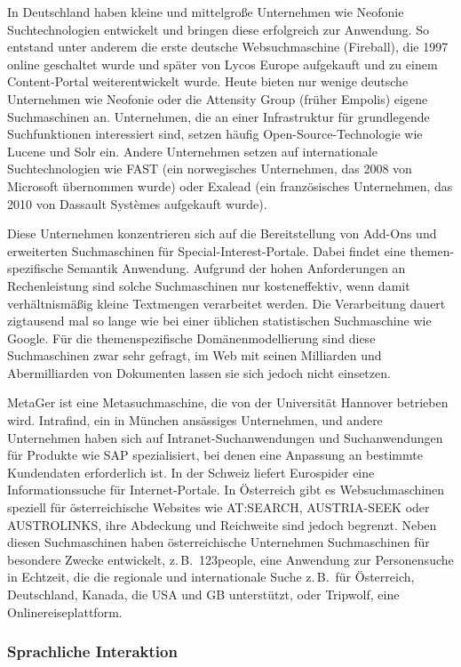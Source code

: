 \documentclass[]{../../metanetpaper}
\begin{document}
\begin{multicols}{2}
In Deutschland haben kleine und mittelgroße Unternehmen wie Neofonie Suchtechnologien entwickelt und bringen diese erfolgreich zur Anwendung. So entstand unter anderem die erste deutsche Websuchmaschine (Fireball), die 1997 online geschaltet wurde und später von Lycos Europe aufgekauft und zu einem Content-Portal weiterentwickelt wurde. Heute bieten nur wenige deutsche Unternehmen wie Neofonie oder die Attensity Group (früher Empolis) eigene Suchmaschinen an. Unternehmen, die an einer Infrastruktur für grundlegende Suchfunktionen interessiert sind, setzen häufig Open-Source-Technologie wie Lucene und Solr ein. Andere Unternehmen setzen auf internationale Suchtechnologien wie FAST (ein norwegisches Unternehmen, das 2008 von Microsoft übernommen wurde) oder Exalead (ein französisches Unternehmen, das 2010 von Dassault Systèmes aufgekauft wurde).

Diese Unternehmen konzentrieren sich auf die Bereitstellung von Add-Ons und erweiterten Suchmaschinen für Special-Interest-Portale. Dabei findet eine themen-spezifische Semantik Anwendung. Aufgrund der hohen Anforderungen an Rechenleistung sind solche Suchmaschinen nur kosteneffektiv, wenn damit verhältnismäßig kleine Textmengen verarbeitet werden. Die Verarbeitung dauert zigtausend mal so lange wie bei einer üblichen statistischen Suchmaschine wie Google. Für die themenspezifische Domänenmodellierung sind diese Suchmaschinen zwar sehr gefragt, im Web mit seinen Milliarden und Abermilliarden von Dokumenten lassen sie sich jedoch nicht einsetzen.

MetaGer ist eine Metasuchmaschine, die von der Universität Hannover betrieben wird. Intrafind, ein in München ansässiges Unternehmen, und andere Unternehmen haben sich auf Intranet-Suchanwendungen und Suchanwendungen für Produkte wie SAP spezialisiert, bei denen eine Anpassung an bestimmte Kundendaten erforderlich ist. In der Schweiz liefert Eurospider eine Informationssuche für Internet-Portale. In Österreich gibt es Websuchmaschinen speziell für österreichische Websites wie AT:SEARCH, AUSTRIA-SEEK oder AUSTROLINKS, ihre Abdeckung und Reichweite sind jedoch begrenzt. Neben diesen Suchmaschinen haben österreichische Unternehmen Suchmaschinen für besondere Zwecke entwickelt, z.\,B.~123people, eine Anwendung zur Personensuche in Echtzeit, die die regionale und internationale Suche z.\,B.~für Österreich, Deutschland, Kanada, die USA und GB unterstützt, oder Tripwolf, eine Onlinereiseplattform.
  
\subsubsection{Sprachliche Interaktion}


\end{multicols}
\end{document}
